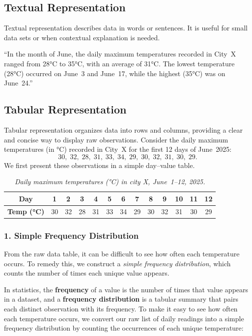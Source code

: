 \documentclass[twoside]{book}
\begin{document}
\subsection{Textual Representation}
Textual representation describes data in words or sentences. It is useful for small data sets or when contextual explanation is needed.

  ``In the month of June, the daily maximum temperatures recorded in City X ranged from 28°C to 35°C, with an average of 31°C. The lowest temperature (28°C) occurred on June 3 and June 17, while the highest (35°C) was on June 24.''

\subsection{Tabular Representation}

Tabular representation organizes data into rows and columns, providing a clear and concise way to display raw observations. Consider the daily maximum temperatures (in °C) recorded in City X for the first 12 days of June 2025:
\[
30,\;32,\;28,\;31,\;33,\;34,\;29,\;30,\;32,\;31,\;30,\;29.
\]
We first present these observations in a simple day–value table.

\begin{table}[H]
\centering
\begin{tabular}{c|cccccccccccc}
\toprule
\textbf{Day}        & 1  & 2  & 3  & 4  & 5  & 6  & 7  & 8  & 9  & 10 & 11 & 12 \\ \midrule
\textbf{Temp (°C)}  & 30 & 32 & 28 & 31 & 33 & 34 & 29 & 30 & 32 & 31 & 30 & 29 \\
\bottomrule
\end{tabular}
\caption{\textit{Daily maximum temperatures (°C) in city X, June 1–12, 2025.}}
\end{table}

\subsubsection{1. Simple Frequency Distribution}

From the raw data table, it can be difficult to see how often each temperature occurs. To remedy this, we construct a \emph{simple frequency distribution}, which counts the number of times each unique value appears.

In statistics, the \textbf{frequency} of a value is the number of times that value appears in a dataset, and a \textbf{frequency distribution} is a tabular summary that pairs each distinct observation with its frequency.  To make it easy to see how often each temperature occurs, we convert our raw list of daily readings into a simple frequency distribution by counting the occurrences of each unique temperature:
\end{document}
